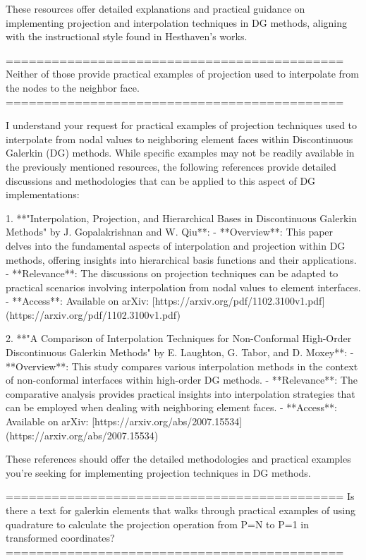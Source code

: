 These resources offer detailed explanations and practical guidance on implementing projection and interpolation techniques in DG methods, aligning with the instructional style found in Hesthaven's works. 

============================================
Neither of those provide practical examples of projection used to interpolate from the nodes to the neighbor face.
============================================

I understand your request for practical examples of projection techniques used to interpolate from nodal values to neighboring element faces within Discontinuous Galerkin (DG) methods. While specific examples may not be readily available in the previously mentioned resources, the following references provide detailed discussions and methodologies that can be applied to this aspect of DG implementations:

1. **"Interpolation, Projection, and Hierarchical Bases in Discontinuous Galerkin Methods" by J. Gopalakrishnan and W. Qiu**:
   - **Overview**: This paper delves into the fundamental aspects of interpolation and projection within DG methods, offering insights into hierarchical basis functions and their applications.
   - **Relevance**: The discussions on projection techniques can be adapted to practical scenarios involving interpolation from nodal values to element interfaces.
   - **Access**: Available on arXiv: [https://arxiv.org/pdf/1102.3100v1.pdf](https://arxiv.org/pdf/1102.3100v1.pdf)

2. **"A Comparison of Interpolation Techniques for Non-Conformal High-Order Discontinuous Galerkin Methods" by E. Laughton, G. Tabor, and D. Moxey**:
   - **Overview**: This study compares various interpolation methods in the context of non-conformal interfaces within high-order DG methods.
   - **Relevance**: The comparative analysis provides practical insights into interpolation strategies that can be employed when dealing with neighboring element faces.
   - **Access**: Available on arXiv: [https://arxiv.org/abs/2007.15534](https://arxiv.org/abs/2007.15534)

These references should offer the detailed methodologies and practical examples you're seeking for implementing projection techniques in DG methods. 

============================================
Is there a text for galerkin elements that walks through practical examples of using quadrature to calculate the projection operation from P=N to P=1 in transformed coordinates?
============================================

